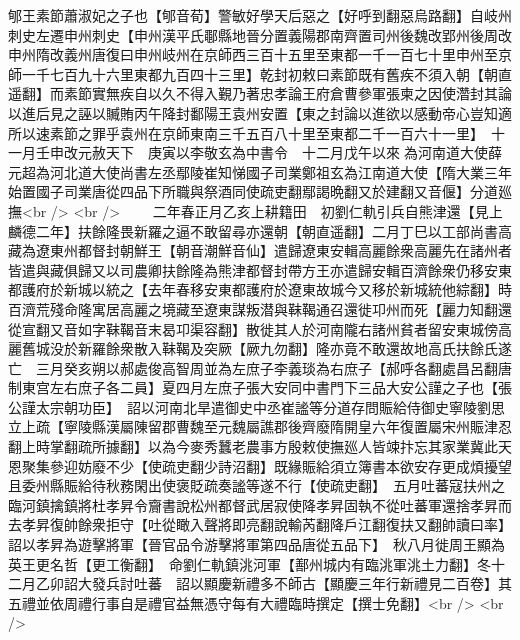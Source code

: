 郇王素節蕭淑妃之子也【郇音荀】警敏好學天后惡之【好呼到翻惡烏路翻】自岐州刺史左遷申州刺史【申州漢平氏鄳縣地晉分置義陽郡南齊置司州後魏改郢州後周改申州隋改義州唐復曰申州岐州在京師西三百十五里至東都一千一百七十里申州至京師一千七百九十六里東都九百四十三里】乾封初敕曰素節既有舊疾不須入朝【朝直遥翻】而素節實無疾自以久不得入覲乃著忠孝論王府倉曹參軍張柬之因使濳封其論以進后見之誣以贓賄丙午降封鄱陽王袁州安置【東之封論以進欲以感動帝心豈知適所以速素節之罪乎袁州在京師東南三千五百八十里至東都二千一百六十一里】　十一月壬申改元赦天下　庚寅以李敬玄為中書令　十二月戊午以來為河南道大使薛元超為河北道大使尚書左丞鄢陵崔知悌國子司業鄭祖玄為江南道大使【隋大業三年始置國子司業唐從四品下所職與祭酒同使疏吏翻鄢謁晩翻又於建翻又音偃】分道廵撫<br />
<br />
　　二年春正月乙亥上耕籍田　初劉仁軌引兵自熊津還【見上麟德二年】扶餘隆畏新羅之逼不敢留尋亦還朝【朝直遥翻】二月丁巳以工部尚書高藏為遼東州都督封朝鮮王【朝音潮鮮音仙】遣歸遼東安輯高麗餘衆高麗先在諸州者皆遣與藏俱歸又以司農卿扶餘隆為熊津都督封帶方王亦遣歸安輯百濟餘衆仍移安東都護府於新城以統之【去年春移安東都護府於遼東故城今又移於新城統他綜翻】時百濟荒殘命隆寓居高麗之境藏至遼東謀叛潜與靺鞨通召還徙卭州而死【麗力知翻還從宣翻又音如字靺鞨音末曷卭渠容翻】散徙其人於河南隴右諸州貧者留安東城傍高麗舊城没於新羅餘衆散入靺鞨及突厥【厥九勿翻】隆亦竟不敢還故地高氏扶餘氏遂亡　三月癸亥朔以郝處俊高智周並為左庶子李義琰為右庶子【郝呼各翻處昌呂翻唐制東宫左右庶子各二員】夏四月左庶子張大安同中書門下三品大安公謹之子也【張公謹太宗朝功臣】　詔以河南北旱遣御史中丞崔謐等分道存問賑給侍御史寧陵劉思立上疏【寧陵縣漢屬陳留郡曹魏至元魏屬譙郡後齊廢隋開皇六年復置屬宋州賑津忍翻上時掌翻疏所據翻】以為今麥秀蠶老農事方殷敕使撫廵人皆竦抃忘其家業冀此天恩聚集參迎妨廢不少【使疏吏翻少詩沼翻】既緣賑給須立簿書本欲安存更成煩擾望且委州縣賑給待秋務閑出使褒貶疏奏謐等遂不行【使疏吏翻】　五月吐蕃寇扶州之臨河鎮擒鎮將杜孝昇令齎書說松州都督武居寂使降孝昇固執不從吐蕃軍還捨孝昇而去孝昇復帥餘衆拒守【吐從瞰入聲將即亮翻說輸芮翻降戶江翻復扶又翻帥讀曰率】詔以孝昇為遊擊將軍【晉官品令游擊將軍第四品唐從五品下】　秋八月徙周王顯為英王更名哲【更工衡翻】　命劉仁軌鎮洮河軍【鄯州城内有臨洮軍洮土力翻】冬十二月乙卯詔大發兵討吐蕃　詔以顯慶新禮多不師古【顯慶三年行新禮見二百卷】其五禮並依周禮行事自是禮官益無憑守每有大禮臨時撰定【撰士免翻】<br />
<br />
